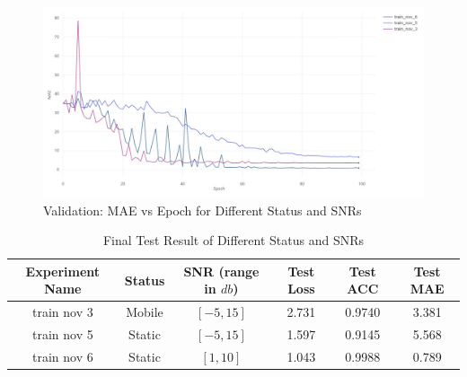 \begin{figure}[H]
    \centering
    \includegraphics[width=1\linewidth]{figures/StatusSNR Valid_ MAE VS epoch.jpeg}
    \caption{Validation: MAE vs Epoch for Different Status and SNRs}
\end{figure}
\begin{table}[H]
    \centering
    \begin{tabular}{|c|c|c|c|c|c|}
        \hline
         Experiment Name& Status & SNR (range in \(db\)) & Test Loss & Test ACC & Test MAE\\
         \hline
         train nov 3 & Mobile & \([-5, 15]\) & 2.731 & 0.9740 & 3.381\\
         \hline
         train nov 5 & Static & \([-5, 15]\) & 1.597 & 0.9145 & 5.568\\
         \hline
         train nov 6 & Static & \([1, 10]\) & 1.043 & 0.9988 & 0.789\\
         \hline
    \end{tabular}
    \caption{Final Test Result of Different Status and SNRs}
\end{table}